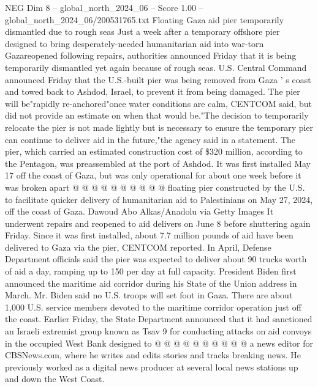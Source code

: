 \begin{textsample}{NEG Dim 8 – global\_north\_2024\_06 – Score 1.00 – global\_north\_2024\_06/200531765.txt}  \label{ex:f8_neg_398}
Floating Gaza aid pier temporarily dismantled due to rough seas Just a week after a temporary offshore pier designed to bring desperately-needed humanitarian aid into war-torn Gazareopened following repairs, authorities announced Friday that it is being temporarily dismantled yet again because of rough seas.
U.S.
Central Command announced Friday that the U.S.-built pier was being removed from Gaza ' s coast and towed back to Ashdod, Israel, to prevent it from being damaged.
The pier will be"rapidly re-anchored"once water conditions are calm, CENTCOM said, but did not provide an estimate on when that would be."The decision to temporarily relocate the pier is not made lightly but is necessary to ensure the temporary pier can continue to deliver aid in the future,"the agency said in a statement.
The pier, which carried an estimated construction cost of \$320 million, according to the Pentagon, was preassembled at the port of Ashdod.
It was first installed May 17 off the coast of Gaza, but was only operational for about one week before it was broken apart @ @ @ @ @ @ @ @ @ @ floating pier constructed by the U.S. to facilitate quicker delivery of humanitarian aid to Palestinians on May 27, 2024, off the coast of Gaza.
Dawoud Abo Alkas/Anadolu via Getty Images It underwent repairs and reopened to aid delivers on June 8 before shuttering again Friday.
Since it was first installed, about 7.7 million pounds of aid have been delivered to Gaza via the pier, CENTCOM reported.
In April, Defense Department officials said the pier was expected to deliver about 90 trucks worth of aid a day, ramping up to 150 per day at full capacity.
President Biden first announced the maritime aid corridor during his State of the Union address in March.
Mr.
Biden said no U.S. troops will set foot in Gaza.
There are about 1,000 U.S. service members devoted to the maritime corridor operation just off the coast.
Earlier Friday, the State Department announced that it had sanctioned an Israeli extremist group known as Tsav 9 for conducting attacks on aid convoys in the occupied West Bank designed to @ @ @ @ @ @ @ @ @ @ a news editor for CBSNews.com, where he writes and edits stories and tracks breaking news.
He previously worked as a digital news producer at several local news stations up and down the West Coast.

\end{textsample}
